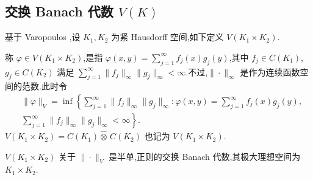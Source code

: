 \subsection{\texorpdfstring{交换 Banach 代数 $V(K)$}{交换 Banach 代数 V(K)}}\label{sec:3.4.3}

基于 Varopoulos \cite{ch3:52},设 $K_{1}, K_{2}$ 为紧 Hausdorff 空间,如下定义 $V(K_{1} \times K_{2})$.

\begin{definition}\label{def:3.4.6}
称 $\varphi \in V(K_{1} \times K_{2})$,是指 $\varphi(x, y) = \sum_{j=1}^{\infty} f_{j}(x)g_{j}(y)$,其中 $f_{j} \in C(K_{1})$,$g_{j} \in C(K_{2})$ 满足 $\sum_{j=1}^{\infty}\|f_{j}\|_{\infty}\|g_{j}\|_{\infty} < \infty$.不过,$\|\cdot\|_{\infty}$ 是作为连续函数空间的范数.此时令
\begin{equation*}
\begin{aligned}
&\|\varphi\|_{V} = \inf\left\{\sum_{j=1}^{\infty}\|f_{j}\|_{\infty}\|g_{j}\|_{\infty}: \varphi(x, y) = \sum_{j=1}^{\infty}f_{j}(x)g_{j}(y),\right.\\
&\left.\sum_{j=1}^{\infty}\|f_{j}\|_{\infty}\|g_{j}\|_{\infty} < \infty\right\}.
\end{aligned}
\end{equation*}
$V(K_{1} \times K_{2}) = C(K_{1}) \widehat{\otimes}\, C(K_{2})$ 也记为 $V(K_{1} \times K_{2})$.
\end{definition}

\begin{proposition}\label{prop:3.4.7}
$V(K_{1} \times K_{2})$ 关于 $\|\cdot\|_{V}$ 是半单,正则的交换 Banach 代数,其极大理想空间为 $K_{1} \times K_{2}$.
\end{proposition}

